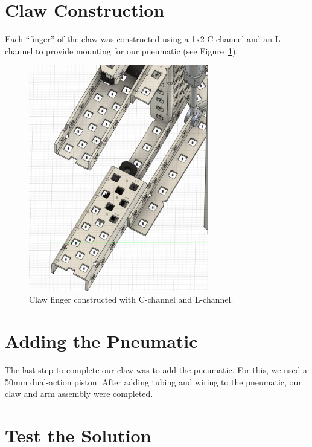 \section*{Claw Construction}
Each “finger” of the claw was constructed using a 1x2 C-channel and an L-channel to provide mounting for our pneumatic (see Figure~\ref{fig:clawfinger}). 

\begin{figure}[H]
    \centering
     \includegraphics[width=0.7\textwidth]{images/clawfinger.png}
    \caption{Claw finger constructed with C-channel and L-channel.}
    \label{fig:clawfinger}
\end{figure}

\section*{Adding the Pneumatic}
The last step to complete our claw was to add the pneumatic. For this, we used a 50mm dual-action piston. After adding tubing and wiring to the pneumatic, our claw and arm assembly were completed.
\section*{Test the Solution}